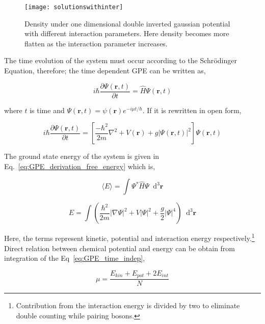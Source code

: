 \documentclass[a4paper,times,hidelinks,12pt]{article}
\newcommand*\dif{\mathop{}\!\mathrm{d}}
\begin{document}
\graphicspath{{"../figs/potentials/"}}
\begin{figure}[H]
    \centering
    \texttt{[image: solutionswithinter]}
    \caption{Density under one dimensional double inverted gaussian potential with different interaction parameters. Here density becomes more flatten as the interaction parameter increases.}
\label{fig:gaussian_pot_and_density}
\end{figure}


\noindent The time evolution of the system must occur according to the Schr{\"o}dinger Equation, therefore; the time dependent GPE can be written as,

\begin{equation}
\label{eq:GPE_time_evolution}
i \hbar \frac{\partial\Psi(\boldsymbol{r}, t)}{\partial t} = \hat{H}\Psi(\boldsymbol{r}, t)
\end{equation}

\noindent  where $t$ is time and $\Psi(\boldsymbol{r}, t) = \psi(\boldsymbol{r})e^{-i\mu t/\hbar} $. If it is rewritten in open form,

\begin{equation}
\label{eq:GPE_time_indep}
i \hbar \frac{\partial\Psi(\boldsymbol{r}, t)}{\partial t} = \left[\frac{-\hbar^2}{2m}\nabla^2 + V(\boldsymbol{r}) + g|\Psi(\boldsymbol{r}, t)|^2 \right] \Psi(\boldsymbol{r}, t)
\end{equation}

\noindent The ground state energy of the system is given in Eq.~\eqref{eq:GPE_derivation_free_energy} which is,

\begin{equation}
\label{GPE_total_energy_general}
\langle E \rangle = \int \Psi^{*}\hat{H}\Psi \dif^3\boldsymbol{r}
\end{equation}

\begin{equation}
\label{GPE_total_energy}
E = \int \left(\frac {\hbar^2}{2m}|\nabla
\Psi|^2 + V|\Psi|^2 + \frac{g}{2}|\Psi|^4 \right) \dif^3 \boldsymbol{r}
\end{equation}

\noindent Here, the terms represent kinetic, potential and interaction energy respectively.\footnote{Contribution from the interaction energy is divided by two to eliminate double counting while pairing bosons.} Direct relation between chemical potential and energy can be obtain from integration of the Eq~\eqref{eq:GPE_time_indep}, 

\begin{equation}
\label{eq:mu_and_total_en}
\mu = \frac{E_{kin} + E_{pot} + 2E_{int}}{N}
\end{equation}
\end{document}
